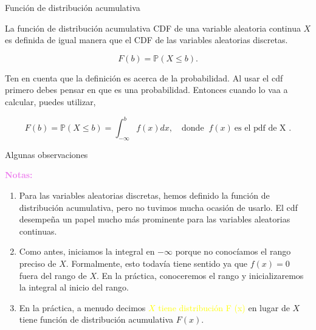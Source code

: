 \documentclass[10pt]{beamer}
\begin{document}
\begin{frame}{Funci\'on de distribuci\'on acumulativa}
\small{La funci\'on de distribuci\'on acumulativa CDF de una variable aleatoria continua $X$ es definida de igual manera que el CDF de las variables aleatorias discretas.

\[
F(b) = \mathbb{P}(X \leq b).
\]

\vspace{0.3cm}

Ten en cuenta que la definici\'on es acerca de la probabilidad. Al usar el cdf primero debes pensar en que es una probabilidad. Entonces cuando lo vaa a calcular, puedes utilizar,

\[
F(b) = \mathbb{P}(X \leq b) = \int_{-\infty}^{b}f(x) dx, \quad \text{donde }\  f(x)\  \text{es el pdf  de X }.
\]	
}
\end{frame}
\begin{frame}{Algunas observaciones}
\small{ \textcolor{violet}{\textbf{Notas:}}
		
\begin{enumerate}
\item Para las variables aleatorias discretas, hemos definido la funci\'on de distribuci\'on acumulativa, pero no tuvimos mucha ocasi\'on de usarlo. El cdf desempe\~na un papel mucho m\'as prominente para las variables aleatorias continuas.
	
\item Como antes, iniciamos la integral en $-\infty$ porque no conoc\'iamos el rango preciso de $X$. Formalmente, esto todav\'ia tiene sentido ya que $f(x) = 0$ fuera del rango de $X$. En la pr\'actica, conoceremos el rango y inicializaremos la integral al inicio del rango.

\item En la pr\'actica, a menudo decimos \textcolor{yellow}{$X$ tiene distribuci\'on F (x)} en lugar de $X$ tiene funci\'on de distribuci\'on acumulativa $F(x)$.
\end{enumerate}

}
\end{frame}
\end{document}
